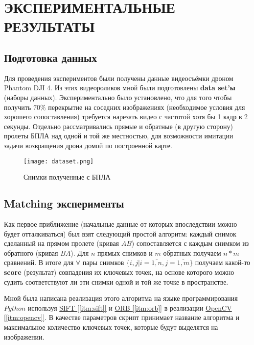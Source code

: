 \chapter{ЭКСПЕРИМЕНТАЛЬНЫЕ РЕЗУЛЬТАТЫ}

\section{Подготовка данных}

Для проведения экспериментов были получены данные видеосъёмки дроном Phantom DJI 4. Из этих видеороликов мной были подготовлены \textbf{data set'ы} (наборы данных). Экспериментально было установлено, что для того чтобы получить $70\%$ перекрытие на соседних изображениях (необходимое условия для хорошего сопоставления) требуется нарезать видео с частотой хотя бы 1 кадр в 2 секунды. Отдельно рассматривались прямые и обратные (в другую сторону) пролеты БПЛА над одной и той же местностью, для возможности имитации задачи возвращения дрона домой по построенной карте.

\begin{figure}[h]
    \centering
    \texttt{[image: dataset.png]}
    \caption{Снимки полученные с БПЛА}
    \label{fig:dataset}
\end{figure}

\section{Matching эксперименты}

Как первое приближение (начальные данные от которых впоследствии можно будет отталкиваться) был взят следующий простой алгоритм: каждый снимок сделанный на прямом пролете (кривая $AB$) сопоставляется с каждым снимком из обратного (кривая $BA$). Для $n$ прямых снимков и $m$ обратных получаем $n*m$ сравнений. В итоге для $\forall$ пары снимков $\{i, j | i=\overline{1,n}, j=\overline{1,m}\}$ получаем какой-то \textbf{score} (результат) совпадения их ключевых точек, на основе которого можно судить соответствуют ли эти снимки одной и той же точке в пространстве.

Мной была написана реализация этого алгоритма на языке программирования $Python$ используя \hyperref[itm:sift]{SIFT [\ref{itm:sift}]} и \hyperref[itm:orb]{ORB [\ref{itm:orb}]} в реализации \hyperref[itm:opencv]{OpenCV [\ref{itm:opencv}]}. В качестве параметров скрипт принимает название алгоритма и максимальное количество ключевых точек, которые будут выделятся на изображении.

